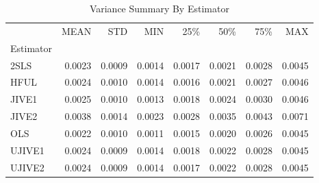 \begin{table}[ht]
\centering
\caption{Variance Summary By Estimator}
\begin{tabular}{lrrrrrrr}
\toprule
 & MEAN & STD & MIN & 25\% & 50\% & 75\% & MAX \\
Estimator &  &  &  &  &  &  &  \\
\midrule
2SLS & 0.0023 & 0.0009 & 0.0014 & 0.0017 & 0.0021 & 0.0028 & 0.0045 \\
HFUL & 0.0024 & 0.0010 & 0.0014 & 0.0016 & 0.0021 & 0.0027 & 0.0046 \\
JIVE1 & 0.0025 & 0.0010 & 0.0013 & 0.0018 & 0.0024 & 0.0030 & 0.0046 \\
JIVE2 & 0.0038 & 0.0014 & 0.0023 & 0.0028 & 0.0035 & 0.0043 & 0.0071 \\
OLS & 0.0022 & 0.0010 & 0.0011 & 0.0015 & 0.0020 & 0.0026 & 0.0045 \\
UJIVE1 & 0.0024 & 0.0009 & 0.0014 & 0.0018 & 0.0022 & 0.0028 & 0.0045 \\
UJIVE2 & 0.0024 & 0.0009 & 0.0014 & 0.0017 & 0.0022 & 0.0028 & 0.0045 \\
\bottomrule
\end{tabular}
\end{table}
